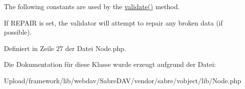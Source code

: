 The following constants are used by the \mbox{\hyperlink{class_sabre_1_1_v_object_1_1_node_af9c38fcb5a0bc73f4d4fe39663a4abdd}{validate()}} method.

If R\+E\+P\+A\+IR is set, the validator will attempt to repair any broken data (if possible). 

Definiert in Zeile 27 der Datei Node.\+php.



Die Dokumentation für diese Klasse wurde erzeugt aufgrund der Datei\+:\begin{DoxyCompactItemize}
\item 
Upload/framework/lib/webdav/\+Sabre\+D\+A\+V/vendor/sabre/vobject/lib/Node.\+php\end{DoxyCompactItemize}
